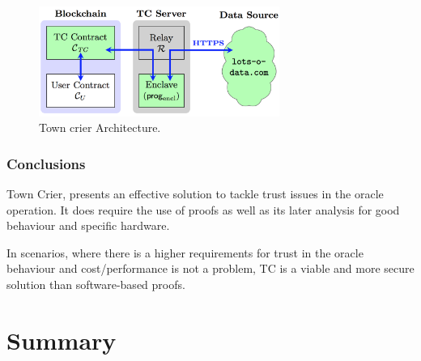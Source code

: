\begin{figure}[H]
    \begin{center}
      \leavevmode
      \includegraphics[width=0.7\textwidth]{figures/town-crier.png}
      \caption{Town crier Architecture.}
      \label{fig:/figures/town-crier2}
    \end{center}
\end{figure}



\subsubsection{Conclusions}
Town Crier, presents an effective solution to tackle trust issues in the oracle operation. It does require the use of proofs as well as its later analysis for good behaviour and specific hardware.

In scenarios, where there is a higher requirements for trust in the oracle behaviour and cost/performance is not a problem, TC is a viable and more secure solution than software-based proofs.


\section{Summary}

